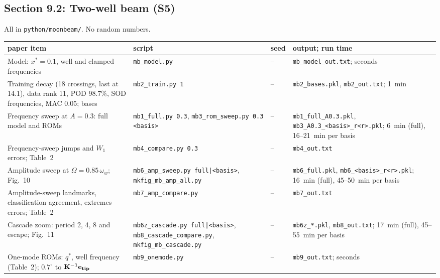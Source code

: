 \documentclass[10pt]{article}
\newcommand{\f}[1]{\texttt{#1}}
\begin{document}
\subsection*{Section 9.2: Two-well beam (S5)}
All in \f{python/\allowbreak{}moonbeam/\allowbreak{}}. No random numbers.
\begin{longtable}{L{0.31\textwidth}L{0.25\textwidth}L{0.08\textwidth}L{0.25\textwidth}}
\toprule
paper item & script & seed & output; run time\\ \midrule
Model: $x^*=0.1$, well and clamped frequencies & \f{mb\_\allowbreak{}model.py} & -- & \f{mb\_\allowbreak{}model\_\allowbreak{}out.txt}; seconds\\
Training decay (18 crossings, last at 14.1), data rank 11, POD 98.7\%, SOD frequencies, MAC 0.05; bases & \f{mb2\_\allowbreak{}train.py 1} & -- & \f{mb2\_\allowbreak{}bases.pkl}, \f{mb2\_\allowbreak{}out.txt}; 1~min\\
Frequency sweep at $A=0.3$: full model and ROMs & \f{mb1\_\allowbreak{}full.py 0.3}, \f{mb3\_\allowbreak{}rom\_\allowbreak{}sweep.py 0.3 <basis>} & -- & \f{mb1\_\allowbreak{}full\_\allowbreak{}A0.3.pkl}, \f{mb3\_\allowbreak{}A0.3\_\allowbreak{}<basis>\_\allowbreak{}r<r>.pkl}; 6~min (full), 16--21~min per basis\\
Frequency-sweep jumps and $W_1$ errors; Table~2 & \f{mb4\_\allowbreak{}compare.py 0.3} & -- & \f{mb4\_\allowbreak{}out.txt}\\
Amplitude sweep at $\Omega=0.85\,\omega_w$; Fig.~10 & \f{mb6\_\allowbreak{}amp\_\allowbreak{}sweep.py full|<basis>}, \f{mkfig\_\allowbreak{}mb\_\allowbreak{}amp\_\allowbreak{}all.py} & -- & \f{mb6\_\allowbreak{}full.pkl}, \f{mb6\_\allowbreak{}<basis>\_\allowbreak{}r<r>.pkl}; 16~min (full), 45--50~min per basis\\
Amplitude-sweep landmarks, classification agreement, extremes errors; Table~2 & \f{mb7\_\allowbreak{}amp\_\allowbreak{}compare.py} & -- & \f{mb7\_\allowbreak{}out.txt}\\
Cascade zoom: period 2, 4, 8 and escape; Fig.~11 & \f{mb6z\_\allowbreak{}cascade.py full|<basis>}, \f{mb8\_\allowbreak{}cascade\_\allowbreak{}compare.py}, \f{mkfig\_\allowbreak{}mb\_\allowbreak{}cascade.py} & -- & \f{mb6z\_\allowbreak{}*.pkl}, \f{mb8\_\allowbreak{}out.txt}; 17~min (full), 45--55~min per basis\\
One-mode ROMs: $q^*$, well frequency (Table~2); $0.7^\circ$ to $\bf K^{-1}e_{tip}$ & \f{mb9\_\allowbreak{}onemode.py} & -- & \f{mb9\_\allowbreak{}out.txt}; seconds\\
\bottomrule
\end{longtable}
\end{document}

